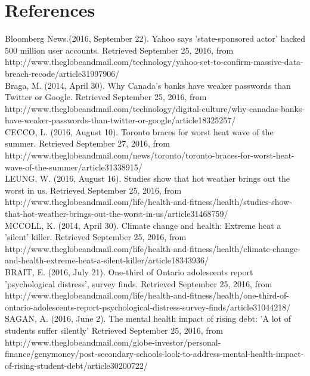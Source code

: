 \documentclass{article}
\begin{document}
\section{References}
\noindent
[1] Bloomberg News.(2016, September 22). Yahoo says 'state-sponsored actor' hacked 500 million user accounts. Retrieved September 25, 2016, from http://www.theglobeandmail.com/technology/yahoo-set-to-confirm-massive-data-breach-recode/article31997906/\\
\noindent
[2] Braga, M. (2014, April 30). Why Canada's banks have weaker passwords than Twitter or Google. Retrieved September 25, 2016, from \\
http://www.theglobeandmail.com/technology/digital-culture/why-canadas-banks-have-weaker-passwords-than-twitter-or-google/article18325257/ \\
\noindent
[3] CECCO, L. (2016, August 10). Toronto braces for worst heat wave of the summer. Retrieved September 27, 2016, from \\
http://www.theglobeandmail.com/news/toronto/toronto-braces-for-worst-heat-wave-of-the-summer/article31338915/ \\
\noindent
[4] LEUNG, W. (2016, August 16). Studies show that hot weather brings out the worst in us. Retrieved September 25, 2016, from \\
http://www.theglobeandmail.com/life/health-and-fitness/health/studies-show-that-hot-weather-brings-out-the-worst-in-us/article31468759/\\
\noindent
[5] MCCOLL, K. (2014, April 30). Climate change and health: Extreme heat a 'silent' killer. Retrieved September 25, 2016, from http://www.theglobeandmail.com/life/health-and-fitness/health/climate-change-and-health-extreme-heat-a-silent-killer/article18343936/\\
\noindent
[6] BRAIT, E. (2016, July 21). One-third of Ontario adolescents report 'psychological distress', survey finds. Retrieved September 25, 2016, from \\
http://www.theglobeandmail.com/life/health-and-fitness/health/one-third-of-ontario-adolescents-report-psychological-distress-survey-finds/article31044218/\\
\noindent
[7] SAGAN, A. (2016, June 2). The mental health impact of rising debt: 'A lot of students suffer silently' Retrieved September 25, 2016, from \\
http://www.theglobeandmail.com/globe-investor/personal-finance/genymoney/post-secondary-schools-look-to-address-mental-health-impact-of-rising-student-debt/article30200722/\\
\end{document}
